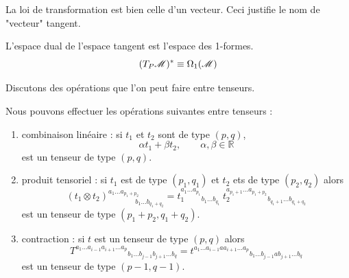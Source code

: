 \documentclass[a4paper,11pt]{report}
\begin{document}
                La loi de transformation est bien celle d'un vecteur. Ceci justifie le nom de "vecteur" tangent.\\
                
                \begin{prop}\begin{leftbar}
                    L'espace dual de l'espace tangent est l'espace des 1-formes.
                    \begin{equation}
                        (T_P\mathscr{M})^* \equiv \Omega_1(\mathscr{M})
                    \end{equation}
                \end{leftbar}\end{prop}
                
                Discutons des opérations que l'on peut faire entre tenseurs.
                
                \begin{prop}\begin{leftbar}
                    Nous pouvons effectuer les opérations suivantes entre tenseurs :
                    \begin{enumerate}[label = \textit{\roman*)}]
                        \item combinaison linéaire : si $t_1$ et $t_2$ sont de type $(p,q)$,
                        \begin{equation}
                            \alpha t_1 + \beta t_2, \qquad\alpha,\beta\in\mathbb{R}
                        \end{equation} 
                        est un tenseur de type $(p,q)$.
                        \item produit tensoriel : si $t_1$ est de type $(p_1,q_1)$ et $t_2$ ets de type $(p_2,q_2)$ alors
                        \begin{equation}
                            (t_1\otimes t_2)_{\qquad\qquad b_1\dots b_{q_1+q_2}}^{a_1\dots a_{p_1+p_2}} =
                            t_1^{a_1\dots a_{p_1}}{}_{b_1\dots b_{q_1}}~t_2^{a_{p_1+1}\dots a_{p_1+p_2}}{}_{b_{q_1+1}\dots b_{q_1+q_2}}
                        \end{equation}
                        est un tenseur de type $(p_1+p_2,q_1+q_2)$.
                        \item contraction : si $t$ est un tenseur de type $(p,q)$ alors
                        \begin{equation}
                            T^{a_1\dots a_{i-1}a_{i+1}\dots a_p}{}_{b_1\dots b_{j-1}b_{j+1}\dots b_q} = t^{a_1\dots a_{i-1} a a_{i+1}\dots a_p}{}_{b_1\dots b_{j-1} a b_{j+1}\dots b_q}
                        \end{equation}
                        est un tenseur de type $(p-1,q-1)$.
                    \end{enumerate}
                \end{leftbar}\end{prop}
                
\end{document}
